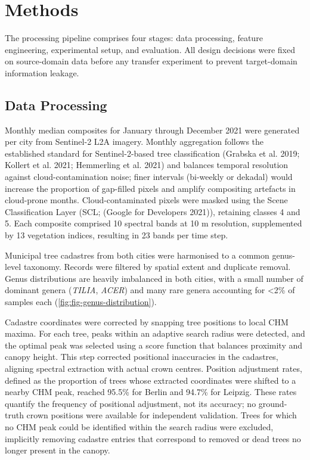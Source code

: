 \documentclass[11pt,a4paper]{scrartcl}
\begin{document}
\section{Methods}\label{methods}

The processing pipeline comprises four stages: data processing, feature
engineering, experimental setup, and evaluation. All design decisions
were fixed on source-domain data before any transfer experiment to
prevent target-domain information leakage.

\subsection{Data Processing}\label{data-processing}

Monthly median composites for January through December 2021 were
generated per city from Sentinel-2 L2A imagery. Monthly aggregation
follows the established standard for Sentinel-2-based tree
classification (Grabska et al. 2019; Kollert et al. 2021; Hemmerling et
al. 2021) and balances temporal resolution against cloud-contamination
noise; finer intervals (bi-weekly or dekadal) would increase the
proportion of gap-filled pixels and amplify compositing artefacts in
cloud-prone months. Cloud-contaminated pixels were masked using the
Scene Classification Layer (SCL; (Google for Developers 2021)),
retaining classes 4 and 5. Each composite comprised 10 spectral bands at
10 m resolution, supplemented by 13 vegetation indices, resulting in 23
bands per time step.

Municipal tree cadastres from both cities were harmonised to a common
genus-level taxonomy. Records were filtered by spatial extent and
duplicate removal. Genus distributions are heavily imbalanced in both
cities, with a small number of dominant genera (\emph{TILIA},
\emph{ACER}) and many rare genera accounting for \textless2\% of samples
each (\cref{fig:fig-genus-distribution}).

Cadastre coordinates were corrected by snapping tree positions to local
CHM maxima. For each tree, peaks within an adaptive search radius were
detected, and the optimal peak was selected using a score function that
balances proximity and canopy height. This step corrected positional
inaccuracies in the cadastres, aligning spectral extraction with actual
crown centres. Position adjustment rates, defined as the proportion of
trees whose extracted coordinates were shifted to a nearby CHM peak,
reached 95.5\% for Berlin and 94.7\% for Leipzig. These rates quantify
the frequency of positional adjustment, not its accuracy; no
ground-truth crown positions were available for independent validation.
Trees for which no CHM peak could be identified within the search radius
were excluded, implicitly removing cadastre entries that correspond to
removed or dead trees no longer present in the canopy.
\end{document}

